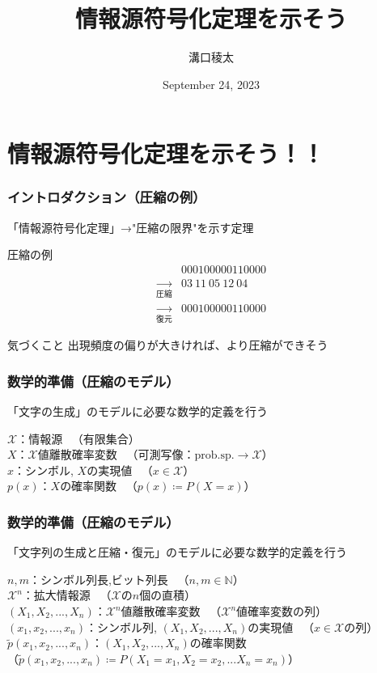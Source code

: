 \documentclass{classes/myslide}
\title{情報源符号化定理を示そう}
\author{溝口稜太}
\institute{創域理工学部情報計算科学科４年}
\date{September 24, 2023}
\begin{document}
\section{情報源符号化定理を示そう！！}

\begin{frame}
  \titlepage
\end{frame}

\begin{frame}\frametitle{イントロダクション（圧縮の例）}

  「情報源符号化定理」→"圧縮の限界"を示す定理

  \begin{exampleblock}{圧縮の例}
    \begin{align*}
      &000100000110000 \\
      \xrightarrow[圧縮]{} & 03 \ 11 \ 05 \ 12 \ 04 \\
      \xrightarrow[復元]{} & 000100000110000 
    \end{align*}
  \end{exampleblock}

  \begin{alertblock}{気づくこと}
    出現頻度の偏りが大きければ、より圧縮ができそう
  \end{alertblock}

\end{frame}

\begin{frame}\frametitle{数学的準備（圧縮のモデル）}
  「文字の生成」のモデルに必要な数学的定義を行う
  \begin{definition}[]
    $\mathcal{X}$：情報源 \ （有限集合）\\
    $X$：$\mathcal{X}$値離散確率変数 \ （可測写像：$\mathrm{prob. sp.} \rightarrow \mathcal{X}$）\\
    $x$：シンボル, $X$の実現値 \ （$ x \in \mathcal{X}$） \\
    $p(x)$：$X$の確率関数 \ （$p(x) \coloneq P(X = x)$）
  \end{definition}
\end{frame}

\begin{frame}\frametitle{数学的準備（圧縮のモデル）}
  「文字列の生成と圧縮・復元」のモデルに必要な数学的定義を行う
  \begin{definition}[]
    $n, m$：シンボル列長,ビット列長 \ （$n, m \in \mathbb{N}$）\\
    $\mathcal{X}^n$：拡大情報源 \ （$\mathcal{X}$の$n$個の直積）\\
    $(X_1, X_2, ..., X_n)$：$\mathcal{X}^n$値離散確率変数 \ （$\mathcal{X}^n$値確率変数の列）\\
    $(x_1, x_2, ..., x_n )$：シンボル列, $(X_1, X_2, ..., X_n)$の実現値 \ （$ x \in \mathcal{X}$の列）\\
    $\tilde{p}(x_1, x_2, ..., x_n )$：$(X_1, X_2, ..., X_n)$の確率関数 \\（$\tilde{p}(x_1, x_2, ..., x_n ) \coloneq P(X_1 = x_1, X_2 = x_2,... X_n = x_n)$）
  \end{definition}
\end{frame}
\end{document}
